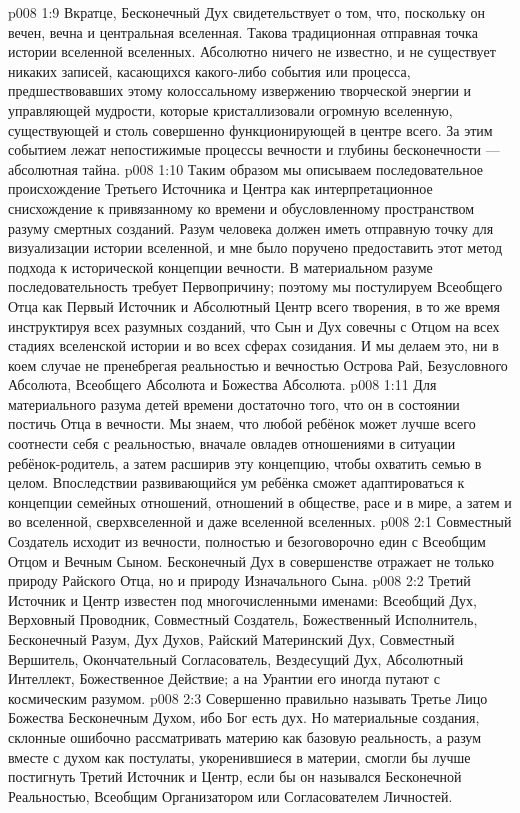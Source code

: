 \vs p008 1:9 Вкратце, Бесконечный Дух свидетельствует о том, что, поскольку он вечен, вечна и центральная вселенная. Такова традиционная отправная точка истории вселенной вселенных. Абсолютно ничего не известно, и не существует никаких записей, касающихся какого\hyp{}либо события или процесса, предшествовавших этому колоссальному извержению творческой энергии и управляющей мудрости, которые кристаллизовали огромную вселенную, существующей и столь совершенно функционирующей в центре всего. За этим событием лежат непостижимые процессы вечности и глубины бесконечности --- абсолютная тайна.
\vs p008 1:10 \pc Таким образом мы описываем последовательное происхождение Третьего Источника и Центра как интерпретационное снисхождение к привязанному ко времени и обусловленному пространством разуму смертных созданий. Разум человека должен иметь отправную точку для визуализации истории вселенной, и мне было поручено предоставить этот метод подхода к исторической концепции вечности. В материальном разуме последовательность требует Первопричину; поэтому мы постулируем Всеобщего Отца как Первый Источник и Абсолютный Центр всего творения, в то же время инструктируя всех разумных созданий, что Сын и Дух совечны с Отцом на всех стадиях вселенской истории и во всех сферах созидания. И мы делаем это, ни в коем случае не пренебрегая реальностью и вечностью Острова Рай, Безусловного Абсолюта, Всеобщего Абсолюта и Божества Абсолюта.
\vs p008 1:11 Для материального разума детей времени достаточно того, что он в состоянии постичь Отца в вечности. Мы знаем, что любой ребёнок может лучше всего соотнести себя с реальностью, вначале овладев отношениями в ситуации ребёнок\hyp{}родитель, а затем расширив эту концепцию, чтобы охватить семью в целом. Впоследствии развивающийся ум ребёнка сможет адаптироваться к концепции семейных отношений, отношений в обществе, расе и в мире, а затем и во вселенной, сверхвселенной и даже вселенной вселенных.
\vs p008 2:1 Совместный Создатель исходит из вечности, полностью и безоговорочно един с Всеобщим Отцом и Вечным Сыном. Бесконечный Дух в совершенстве отражает не только природу Райского Отца, но и природу Изначального Сына.
\vs p008 2:2 \pc Третий Источник и Центр известен под многочисленными именами: Всеобщий Дух, Верховный Проводник, Совместный Создатель, Божественный Исполнитель, Бесконечный Разум, Дух Духов, Райский Материнский Дух, Совместный Вершитель, Окончательный Согласователь, Вездесущий Дух, Абсолютный Интеллект, Божественное Действие; а на Урантии его иногда путают с космическим разумом.
\vs p008 2:3 Совершенно правильно называть Третье Лицо Божества Бесконечным Духом, ибо Бог есть дух. Но материальные создания, склонные ошибочно рассматривать материю как базовую реальность, а разум вместе с духом как постулаты, укоренившиеся в материи, смогли бы лучше постигнуть Третий Источник и Центр, если бы он назывался Бесконечной Реальностью, Всеобщим Организатором или Согласователем Личностей.
